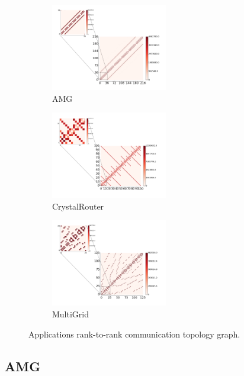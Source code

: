 \begin{figure}[htp]
    \centering
    \begin{subfigure}[t]{0.32\textwidth}
        \centering
        \includegraphics[height=1.5in]{figs/appstudy/amg/amg_pip}
        \caption{AMG}
        \label{fig:amg-communication-topology}
    \end{subfigure}
    \begin{subfigure}[t]{0.32\textwidth}
        \centering
        \includegraphics[height=1.5in]{figs/appstudy/cr/cr_pip}
        \caption{CrystalRouter}
        \label{fig:cr-communication-topology}
    \end{subfigure}
    \begin{subfigure}[t]{0.32\textwidth}
        \centering
        \includegraphics[height=1.5in]{figs/appstudy/mg/mg_pip}
        \caption{MultiGrid}
        \label{fig:mg-communication-topology}
    \end{subfigure}
    \caption{Applications rank-to-rank communication topology graph.}
    \label{fig:apps_communication_matrix}
\end{figure}


\subsection{AMG}
\label{sec:amg}

